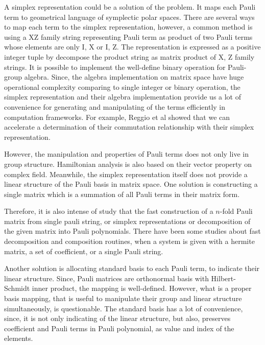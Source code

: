 \documentclass[twocolumn]{article}
\begin{document}
A simplex representation could be a solution of the problem. 
It maps each Pauli term to geometrical language of symplectic polar spaces\cite{havlicek_moebius_2009}.
There are several ways to map each term to the simplex representation, 
however, a common method is using a XZ family string representing Pauli term as product of two Pauli terms whose elements are only I, X or I, Z.
The representation is expressed as a positive integer tuple by decompose the product string as matrix product of X, Z family strings.
It is possible to implement the well-define binary operation for Pauli-group algebra.
Since, the algebra implementation on matrix space have huge operational complexity comparing to 
single integer or binary operation, the simplex representation and their algebra implementation 
provide us a lot of convenience for generating and manipulating of the terms efficiently in computation frameworks.
For example, Reggio et al showed that we can accelerate a determination of their commutation relationship 
with their simplex representation\cite{reggio_fast_2023}.

However, the manipulation and properties of Pauli terms does not only live in group structure. 
Hamiltonian analysis is also based on their vector property on complex field. 
Meanwhile, the simplex representation itself does not provide a linear structure
of the Pauli basis in matrix space.
One solution is constructing a single matrix which is a summation of all Pauli terms in their matrix form.%

Therefore, it is also intense of study that the fast construction of a $n$-fold Pauli matrix from single pauli string, 
or simplex representations or decomposition of the given matrix into Pauli polynomials.
There have been some studies about fast decomposition\cite{hantzko_tensorized_2023, koska_tree-approach_2024, ying_preparing_2023} %
and composition\cite{vidal_romero_paulicomposer_2023} routines,%
when a system is given with a hermite matrix, a set of coefficient, or a single Pauli string.

Another solution is allocating standard basis to each Pauli term, to indicate their 
linear structure. Since, Pauli matrices are orthonormal basis with Hilbert-Schmidt inner product\cite{nielsen2010quantum},
the mapping is well-defined. However, what is a proper basis mapping, that is useful to manipulate their group and linear 
structure simultaneously, is questionable. 
The standard basis has a lot of convenience, since, it is not only indicating of the linear structure, 
but also, preserves coefficient and Pauli terms in Pauli polynomial, as value and index of the elements. 
\end{document}
